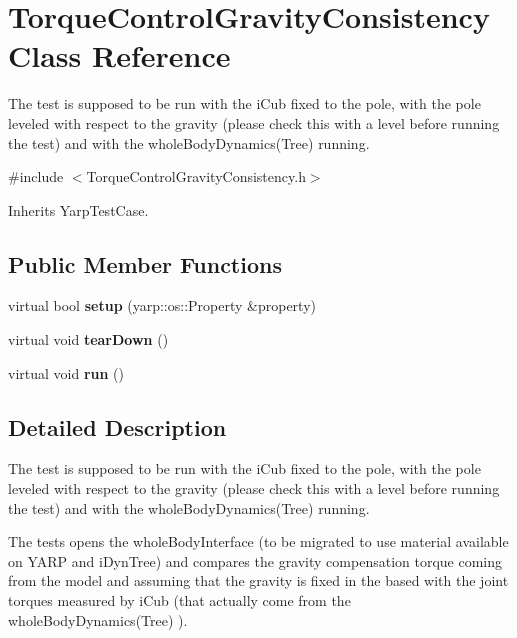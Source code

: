 \section{Torque\+Control\+Gravity\+Consistency Class Reference}
\label{classTorqueControlGravityConsistency}


The test is supposed to be run with the i\+Cub fixed to the pole, with the pole leveled with respect to the gravity (please check this with a level before running the test) and with the whole\+Body\+Dynamics(\+Tree) running.  




{\ttfamily \#include $<$Torque\+Control\+Gravity\+Consistency.\+h$>$}



Inherits Yarp\+Test\+Case.

\subsection*{Public Member Functions}
\begin{DoxyCompactItemize}
\item 
\label{classTorqueControlGravityConsistency_af458d18b20938955516073ffbb9aeb8a} 
virtual bool {\bfseries setup} (yarp\+::os\+::\+Property \&property)
\item 
\label{classTorqueControlGravityConsistency_a530ffd6435bf66da62107510ef379c3b} 
virtual void {\bfseries tear\+Down} ()
\item 
\label{classTorqueControlGravityConsistency_a0a60459b300343fe929867703d38a8da} 
virtual void {\bfseries run} ()
\end{DoxyCompactItemize}


\subsection{Detailed Description}
The test is supposed to be run with the i\+Cub fixed to the pole, with the pole leveled with respect to the gravity (please check this with a level before running the test) and with the whole\+Body\+Dynamics(\+Tree) running. 

The tests opens the whole\+Body\+Interface (to be migrated to use material available on Y\+A\+RP and i\+Dyn\+Tree) and compares the gravity compensation torque coming from the model and assuming that the gravity is fixed in the based with the joint torques measured by i\+Cub (that actually come from the whole\+Body\+Dynamics(\+Tree) ).

